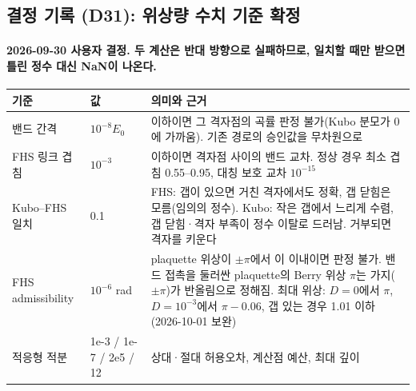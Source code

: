 \subsection{결정 기록 (D31): 위상량 수치 기준 확정}\label{decisions-d31}
\begingroup%
  \framesubtitle{2026-09-30 사용자 결정. 두 계산은 반대 방향으로 실패하므로, 일치할 때만 받으면 틀린 정수 대신 NaN이 나온다.}
  \footnotesize\renewcommand{\arraystretch}{1.1}
  \begin{tabularx}{\textwidth}{@{}P{3.2cm}P{1.6cm}Y@{}}
    \toprule
    기준 & 값 & 의미와 근거 \\
    \midrule
    밴드 간격 & $10^{-8}E_0$ & 이하이면 그 격자점의 곡률 판정 불가(Kubo 분모가 0에 가까움). 기존 경로의 승인값을 무차원으로 \\
    FHS 링크 겹침 & $10^{-3}$ & 이하이면 격자점 사이의 밴드 교차. 정상 경우 최소 겹침 0.55--0.95, 대칭 보호 교차 $10^{-15}$ \\
    Kubo--FHS 일치 & 0.1 & FHS: 갭이 있으면 거친 격자에서도 정확, 갭 닫힘은 모름(임의의 정수). Kubo: 작은 갭에서 느리게 수렴, 갭 닫힘·격자 부족이 정수 이탈로 드러남. 거부되면 격자를 키운다 \\
    FHS admissibility & $10^{-6}$ rad & plaquette 위상이 $\pm\pi$에서 이 이내이면 판정 불가. 밴드 접촉을 둘러싼 plaquette의 Berry 위상 $\pi$는 가지($\pm\pi$)가 반올림으로 정해짐. 최대 위상: $D=0$에서 $\pi$, $D=10^{-3}$에서 $\pi-0.06$, 갭 있는 경우 1.01 이하 (2026-10-01 보완) \\
    적응형 적분 & 1e-3 / 1e-7 / 2e5 / 12 & 상대·절대 허용오차, 계산점 예산, 최대 깊이 \\
    \bottomrule
  \end{tabularx}
  \par\smallskip
\endgroup


